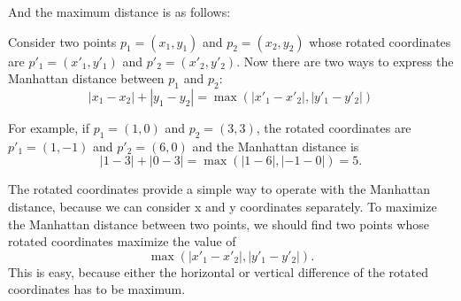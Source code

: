 And the maximum distance is as follows:
\begin{center}
\end{center}

Consider two points $p_1=(x_1,y_1)$ and $p_2=(x_2,y_2)$ whose rotated
coordinates are $p'_1=(x'_1,y'_1)$ and $p'_2=(x'_2,y'_2)$.
Now there are two ways to express the Manhattan distance
between $p_1$ and $p_2$:
\[|x_1-x_2|+|y_1-y_2| = \max(|x'_1-x'_2|,|y'_1-y'_2|)\]

For example, if $p_1=(1,0)$ and $p_2=(3,3)$,
the rotated coordinates are $p'_1=(1,-1)$ and $p'_2=(6,0)$
and the Manhattan distance is
\[|1-3|+|0-3| = \max(|1-6|,|-1-0|) = 5.\]

The rotated coordinates provide a simple way
to operate with the Manhattan distance, because we can
consider x and y coordinates separately.
To maximize the Manhattan distance between two points,
we should find two points whose
rotated coordinates maximize the value of
\[\max(|x'_1-x'_2|,|y'_1-y'_2|).\]
This is easy, because either the horizontal or vertical
difference of the rotated coordinates has to be maximum.
